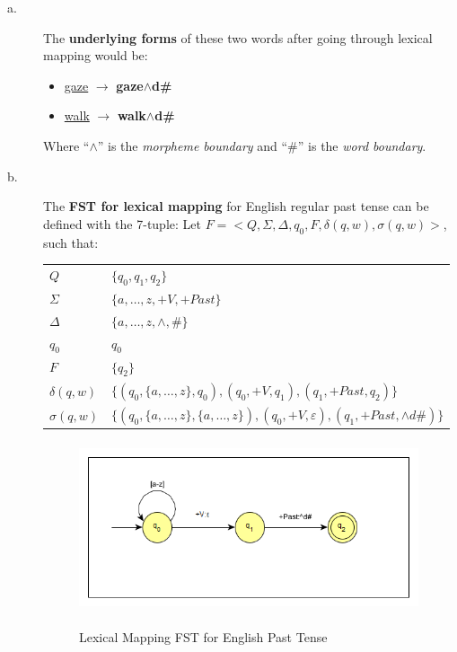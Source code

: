 \documentclass[11pt]{article}
\begin{document}
\begin{solution}
\begin{description}
	\item[a.] The \textbf{underlying forms} of these two words after going through lexical mapping would be:
		\begin{itemize}
			\item \underline{gaze} $\rightarrow$ \textbf{gaze$\wedge$d\#}
			\item \underline{walk} $\rightarrow$ \textbf{walk$\wedge$d\#}
		\end{itemize}
		Where ``$\wedge$'' is the \textit{morpheme boundary} and ``\#'' is the \textit{word boundary}.

	\item[b.] The \textbf{FST for lexical mapping} for English regular past tense can be defined with the 7-tuple:
	Let $F = <Q, \Sigma, \Delta, q_{0}, F, \delta(q, w), \sigma(q, w)>$, such that:

	\begin{tabular}{l | l}
		$Q$ & $\{ q_{0}, q_{1}, q_{2}\}$ \\
		$\Sigma$ & $\{a, \ldots, z, +V, +Past\}$ \\
		$\Delta$ & $\{a, \ldots, z, \wedge, \# \}$ \\
		$q_{0}$ & $q_{0}$ \\
		$F$ & $\{ q_{2} \}$ \\
		$\delta(q, w)$ &  $\{ (q_{0},\{a, \ldots, z\},q_{0}), (q_{0}, +V, q_{1}), (q_{1}, +Past, q_{2}) \}$ \\
		$\sigma(q, w)$ & $\{ (q_{0},\{a, \ldots, z\},\{a, \ldots, z\}), (q_{0}, +V, \varepsilon), (q_{1}, +Past, \wedge d\#) \}$
	\end{tabular}

	\begin{figure}[h]
		\centering
		\includegraphics[width=10cm, height=5cm]{problem07partb} \\
		\caption{Lexical Mapping FST for English Past Tense}
	\end{figure}


\end{description}
\end{solution}
\end{document}
